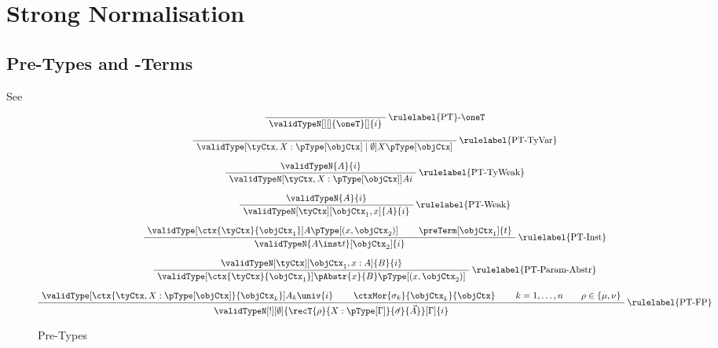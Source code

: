 \documentclass[preprint]{sigplanconf}
\begin{document}
\section{Strong Normalisation}
\label{app:sn}

\subsection*{Pre-Types and -Terms}

\begin{definition}
  See 
  \begin{figure*}
  \begin{gather*}
    \AxiomC{}
    \RightLabel{\rulelabel{PT}-$\oneT$}
    \UnaryInfC{$\validTypeN[][]{\oneT}[]{i}$}
    \DisplayProof
    \\[7pt]
    \AxiomC{}
    \RightLabel{\rulelabel{PT-TyVar}}
    \UnaryInfC{$
      \validType[\tyCtx, X : {\pType[\objCtx]} \mid \emptyset]{X}{
        \pType[\objCtx]}$}
    \DisplayProof
    \\[7pt]
    \AxiomC{$\validTypeN{A}{i}$}
    \RightLabel{\rulelabel{PT-TyWeak}}
    \UnaryInfC{$\validTypeN[\tyCtx, X : {\pType[\objCtx]}]{A}{i}$}
    \DisplayProof
    \\[7pt]
    \AxiomC{$\validTypeN{A}{i}$}
    \RightLabel{\rulelabel{PT-Weak}}
    \UnaryInfC{$\validTypeN[\tyCtx][\objCtx_1, x]{A}{i}$}
    \DisplayProof
    \\[7pt]
    \AxiomC{$\validType[\ctx{\tyCtx}{\objCtx_1}]
      {A}{\pType[(x, \objCtx_2)]}$}
    \AxiomC{$\preTerm[\objCtx_1]{t}$}
    \RightLabel{\rulelabel{PT-Inst}}
    \BinaryInfC{$\validTypeN{A \inst t}[\objCtx_2]{i}$}
    \DisplayProof
    \\[7pt]
    \AxiomC{$\validTypeN[\tyCtx][\objCtx_1, x : A]{B}{i}$}
    \RightLabel{\rulelabel{PT-Param-Abstr}}
    \UnaryInfC{$
      \validType[\ctx{\tyCtx}{\objCtx_1}]
      {\pAbstr{x}{B}}{\pType[(x, \objCtx_2)]}$}
    \DisplayProof
    \\[7pt]
    \AxiomC{$
      \validType[\ctx{\tyCtx, X : {\pType[\objCtx]}}{\objCtx_k}]
      {A_k}{\univ{i}}$}
    \AxiomC{$\ctxMor{\sigma_k}{\objCtx_k}{\objCtx}$}
    \AxiomC{$k = 1, \dotsc, n \qquad \rho \in \{\mu, \nu\}$}
    \RightLabel{\rulelabel{PT-FP}}
    \TrinaryInfC{$
      \validTypeN[!][\emptyset]{
        \recT{\rho}{X : \pType[\Gamma]}{\vec{\sigma}}{\vec{A}}}[\Gamma]{i}$}
    \DisplayProof
  \end{gather*}
    \caption{Pre-Types}
    \label{fig:pre-types}
  \end{figure*}
\end{definition}
\end{document}
